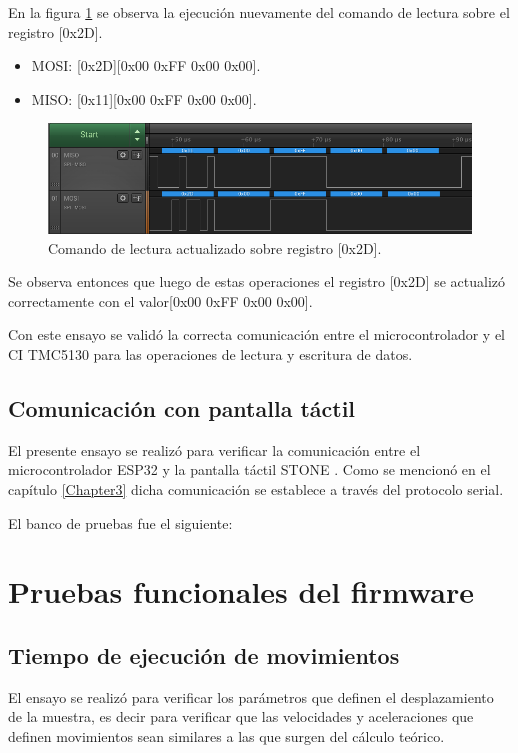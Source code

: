 En la figura \ref{fig:ensayo_spi_c} se observa la ejecución nuevamente del comando de lectura sobre el registro [0x2D].

\begin{itemize}
\item MOSI: [0x2D][0x00 0xFF 0x00 0x00].
\item MISO: [0x11][0x00 0xFF 0x00 0x00].
\end{itemize}


\begin{figure}[h]
\centering 
\includegraphics[width=1\textwidth]{./Figures/ensayo_spi_c_c.png}
\caption{Comando de lectura actualizado sobre registro [0x2D].}
\label{fig:ensayo_spi_c}
\end{figure}

Se observa entonces que luego de estas operaciones el registro [0x2D] se actualizó correctamente con el valor[0x00 0xFF 0x00 0x00].

Con este ensayo se validó la correcta comunicación entre el microcontrolador y el CI TMC5130 para las operaciones de lectura y escritura de datos.
\subsection{Comunicación con pantalla táctil}

El presente ensayo se realizó para verificar la comunicación entre el microcontrolador ESP32 y la pantalla táctil STONE . Como se mencionó en el capítulo \ref{Chapter3} dicha comunicación se establece a través del  protocolo serial.

El banco de pruebas fue el siguiente:



\section{Pruebas funcionales del firmware}
\subsection{Tiempo de ejecución de movimientos}

El ensayo se realizó para verificar los parámetros que definen el desplazamiento de la muestra, es decir para verificar que las velocidades y aceleraciones que definen movimientos sean similares a las que surgen del cálculo teórico.

